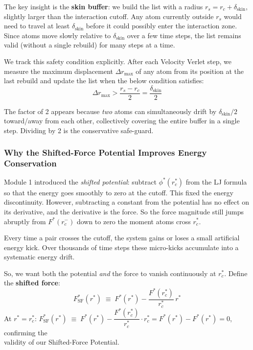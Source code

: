 The key insight is the \textbf{skin buffer}: we build the list with a radius $r_s = r_c + \delta_\text{skin}$, slightly larger than the interaction cutoff. Any atom currently outside $r_s$ would need to travel at least $\delta_\text{skin}$ before it could possibly enter the interaction zone. Since atoms move slowly relative to $\delta_\text{skin}$ over a few time steps, the list remains valid (without a single rebuild) for many steps at a time.

We track this safety condition explicitly. After each Velocity Verlet step, we measure the maximum displacement $\Delta r_\text{max}$ of any atom from its position at the last rebuild and update the list when the below condition satisfies:
\begin{equation}
    \Delta r_\text{max} > \frac{r_s - r_c}{2} = \frac{\delta_\text{skin}}{2}
    \label{eq:rebuild_criterion}
\end{equation}

The factor of 2 appears because \emph{two} atoms can simultaneously drift by $\delta_\text{skin}/2$ toward/away from each other, collectively covering the entire buffer in a single step. Dividing by 2 is the conservative safe-guard.

\subsubsection{Why the Shifted-Force Potential Improves Energy Conservation}

Module 1 introduced the \emph{shifted potential}: subtract $\phi^*(r_c^*)$ from the LJ formula so that the energy goes smoothly to zero at the cutoff. This fixed the energy discontinuity. However, subtracting a constant from the potential has no effect on its derivative, and the derivative is the force. So the force magnitude still jumps abruptly from $F^*(r_c^-)$ down to zero the moment atoms cross $r_c^*$.

Every time a pair crosses the cutoff, the system gains or loses a small artificial energy kick. Over thousands of time steps these micro-kicks accumulate into a systematic energy drift.

So, we want both the potential \emph{and} the force to vanish continuously at $r_c^*$. Define the \textbf{shifted force}:
\begin{equation}
    F_\text{SF}^*(r^*) \;\equiv\; F^*(r^*) - \frac{F^*(r_c^*)}{r_c^*}\,r^*
    \label{eq:sf_force_def}
\end{equation}
At $r^* = r_c^*$: $F_\text{SF}^*(r^*) \;\equiv\; F^*(r^*) - \dfrac{F^*(r_c^*)}{r_c^*}\cdot r^*_c = F^*(r^*) -F^*(r^*)=0$, confirming the \\[0.5em] validity of our Shifted-Force Potential. 

